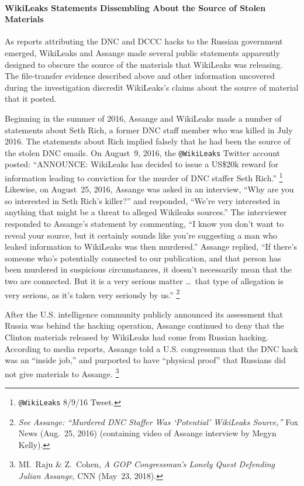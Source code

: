 \paragraph{WikiLeaks Statements Dissembling About the Source of Stolen Materials}

As reports attributing the DNC and DCCC hacks to the Russian government emerged, WikiLeaks and Assange made several public statements apparently designed to obscure the source of the materials that WikiLeaks was  releasing.
The file-transfer evidence described above and other information uncovered during the investigation discredit WikiLeaks's claims about the source of material that it posted.

Beginning in the summer of 2016, Assange and WikiLeaks made a number of statements about Seth Rich, a former DNC staff member who was killed in July 2016.
The statements about Rich implied falsely that he had been the source of the stolen DNC emails.
On August~9, 2016, the \verb+@WikiLeaks+ Twitter account posted: ``ANNOUNCE: WikiLeaks has decided to issue a US\$20k reward for information leading to conviction for the murder of DNC staffer Seth Rich.''%
\footnote{\verb+@WikiLeaks+ 8/9/16 Tweet.}
Likewise, on August~25, 2016, Assange was asked in an interview, ``Why are you so interested in Seth Rich's killer?'' and responded, ``We're very interested in anything that might be a threat to alleged Wikileaks sources.''
The interviewer responded to Assange's statement by commenting, ``I know you don't want to reveal your source, but it certainly sounds like you're suggesting a man who leaked information to WikiLeaks was then murdered.''
Assange replied, ``If there's someone who's potentially connected to our publication, and that person has been murdered in suspicious circumstances, it doesn't necessarily mean that the two are connected.
But it is a very serious matter \dots\ that type of allegation is very serious, as it's taken very seriously by us.''%
\footnote{\textit{See Assange: ``Murdered DNC Staffer Was `Potential' WikiLeaks Source,''} Fox News (Aug.~25, 2016) (containing video of Assange interview by Megyn Kelly).}

After the U.S. intelligence community publicly announced its assessment that Russia was behind the hacking operation, Assange continued to deny that the Clinton materials released by WikiLeaks had come from Russian hacking.
According to media reports, Assange told a U.S. congressman that the DNC hack was an ``inside job,'' and purported to have ``physical proof\thinspace'' that Russians did not give materials to Assange.%
\footnote{MI.~Raju \& Z.~Cohen, \textit{A GOP Congressman's Lonely Quest Defending Julian Assange}, CNN (May~23, 2018).}

